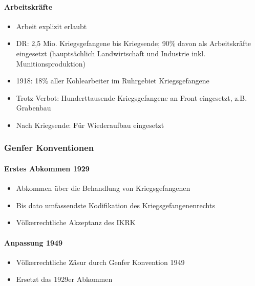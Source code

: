 {}\documentclass[a4paper]{article}
\providecommand{\tightlist}{\setlength{\itemsep}{1mm}\setlength{\parskip}{1mm}}
\begin{document}
\paragraph{Arbeitskräfte}\label{arbeitskruxe4fte}

\begin{itemize}
	\tightlist
	\item
	      Arbeit explizit erlaubt
	\item
	      DR: 2,5 Mio. Kriegsgefangene bis Kriegsende; 90\% davon als
	      Arbeitskräfte eingesetzt (hauptsächlich Landwirtschaft und Industrie
	      inkl. Munitionsproduktion)
	\item
	      1918: 18\% aller Kohlearbeiter im Ruhrgebiet Kriegsgefangene
	\item
	      Trotz Verbot: Hunderttausende Kriegsgefangene an Front eingesetzt,
	      z.B. Grabenbau
	\item
	      Nach Kriegsende: Für Wiederaufbau eingesetzt
\end{itemize}

\subsubsection{Genfer Konventionen}\label{genfer-konventionen}

\paragraph{Erstes Abkommen 1929}\label{erstes-abkommen-1929}

\begin{itemize}
	\tightlist
	\item
	      Abkommen über die Behandlung von Kriegsgefangenen
	\item
	      Bis dato umfassendste Kodifikation des Kriegsgefangenenrechts
	\item
	      Völkerrechtliche Akzeptanz des IKRK
\end{itemize}

\paragraph{Anpassung 1949}\label{anpassung-1949}

\begin{itemize}
	\tightlist
	\item
	      Völkerrechtliche Zäsur durch Genfer Konvention 1949
	\item
	      Ersetzt das 1929er Abkommen
\end{itemize}
\end{document}
